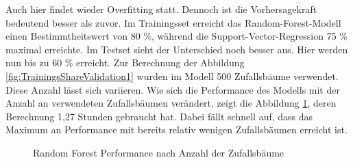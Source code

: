 \documentclass[a4paper,12pt]{thesis}
\begin{document}
Auch hier findet wieder Overfitting statt. Dennoch ist die Vorhersagekraft bedeutend besser als zuvor. Im Trainingsset erreicht das Random-Forest-Modell einen Bestimmtheitswert von 80 \%, während die Support-Vector-Regression 75 \% maximal erreichte. Im Testset sieht der Unterschied noch besser aus. Hier werden nun bis zu 60 \% erreicht. Zur Berechnung der Abbildung \ref{fig:TrainingsShareValidation1} wurden im Modell 500 Zufallsbäume verwendet. Diese Anzahl lässt sich variieren. Wie sich die Performance des Modells mit der Anzahl an verwendeten Zufallsbäumen verändert, zeigt die Abbildung \ref{fig:NTreeValidation1}, deren Berechnung 1,27 Stunden gebraucht hat. Dabei fällt schnell auf, dass das Maximum an Performance mit bereits relativ wenigen Zufallsbäumen erreicht ist.

\begin{figure}%
	\centering
	\qquad
	\caption{Random Forest Performance nach Anzahl der Zufallsbäume}%
	\label{fig:NTreeValidation1}%
\end{figure}
\end{document}
